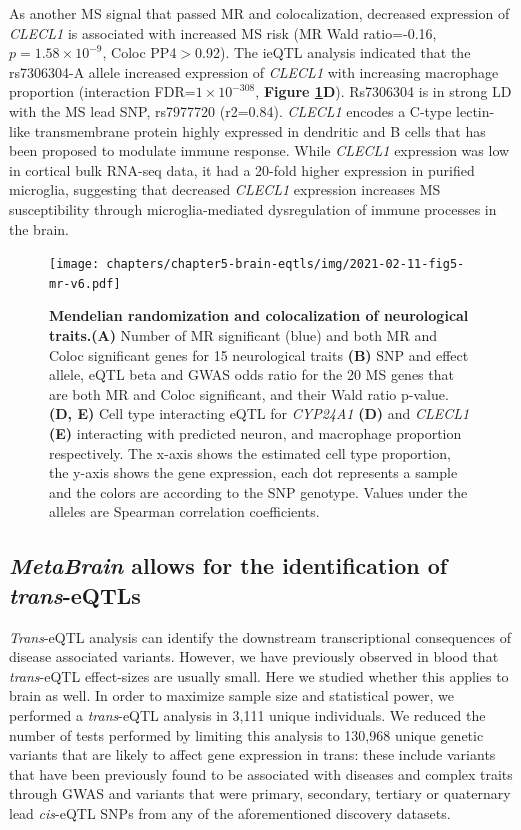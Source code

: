 As another MS signal that passed MR and colocalization, decreased expression of \textit{CLECL1} is associated with increased MS risk (MR Wald ratio=-0.16, $p=1.58 \times 10^{-9}$, Coloc PP4$>$0.92). The ieQTL analysis indicated that the rs7306304-A allele increased expression of \textit{CLECL1} with increasing macrophage proportion (interaction FDR=$1 \times 10^{-308}$, \textbf{Figure \ref{metabrain_fig5}D}). Rs7306304 is in strong LD with the MS lead SNP, rs7977720 (r2=0.84)\cite{consortiumMultipleSclerosisGenomic2019}. \textit{CLECL1} encodes a C-type lectin-like transmembrane protein highly expressed in dendritic and B cells that has been proposed to modulate immune response\cite{vanluijnMultipleSclerosisassociatedCLEC16A2015}. While \textit{CLECL1} expression was low in cortical bulk RNA-seq data, it had a 20-fold higher expression in purified microglia\cite{consortiumMultipleSclerosisGenomic2019}, suggesting that decreased \textit{CLECL1} expression increases MS susceptibility through microglia-mediated dysregulation of immune processes in the brain. 

\begin{figure}
	\texttt{[image: chapters/chapter5-brain-eqtls/img/2021-02-11-fig5-mr-v6.pdf]}
	\caption{\textbf{Mendelian randomization and colocalization of neurological traits.}\textbf{(A)} Number of MR significant (blue) and both MR and Coloc significant genes for 15  neurological traits \textbf{(B)} SNP and effect allele, eQTL beta and GWAS odds ratio for the 20 MS genes that are both MR and Coloc significant, and their Wald ratio p-value. \textbf{(D, E)} Cell type interacting eQTL for \textit{CYP24A1} \textbf{(D)} and \textit{CLECL1} \textbf{(E)} interacting with predicted neuron, and macrophage proportion respectively. The x-axis shows the estimated cell type proportion, the y-axis shows the gene expression, each dot represents a sample and the colors are according to the SNP genotype. Values under the alleles are Spearman correlation coefficients.}
	\label{metabrain_fig5}
\end{figure}

\subsection{\textit{MetaBrain}  allows for the identification of \textit{trans}-eQTLs }
\textit{Trans}-eQTL analysis can identify the downstream transcriptional consequences of disease associated variants. However, we have previously observed in blood that \textit{trans}-eQTL effect-sizes are usually small. Here we studied whether this applies to brain as well. In order to maximize sample size and statistical power, we performed a \textit{trans}-eQTL analysis in 3,111 unique individuals. We reduced the number of tests performed by limiting this analysis to 130,968 unique genetic variants that are likely to affect gene expression in trans: these include variants that have been previously found to be associated with diseases and complex traits through GWAS and variants that were primary, secondary, tertiary or quaternary lead \textit{cis}-eQTL SNPs from any of the aforementioned discovery datasets.  

